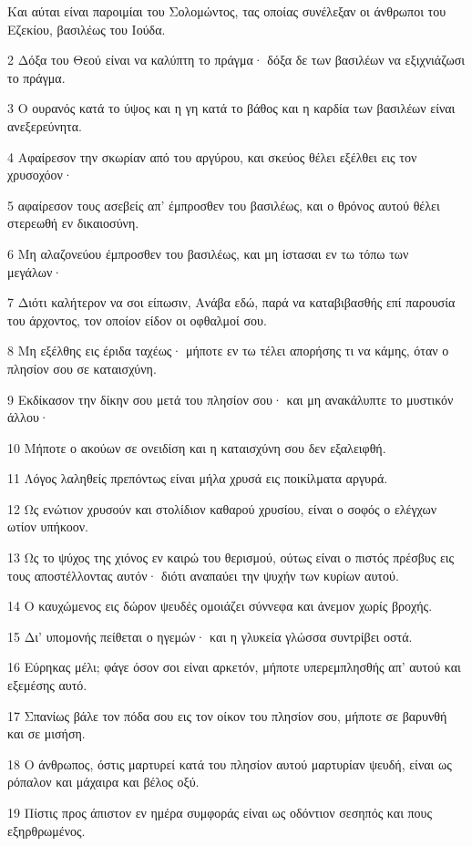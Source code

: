 \par Και αύται είναι παροιμίαι του Σολομώντος, τας οποίας συνέλεξαν οι άνθρωποι του Εζεκίου, βασιλέως του Ιούδα.
\par 2 Δόξα του Θεού είναι να καλύπτη το πράγμα· δόξα δε των βασιλέων να εξιχνιάζωσι το πράγμα.
\par 3 Ο ουρανός κατά το ύψος και η γη κατά το βάθος και η καρδία των βασιλέων είναι ανεξερεύνητα.
\par 4 Αφαίρεσον την σκωρίαν από του αργύρου, και σκεύος θέλει εξέλθει εις τον χρυσοχόον·
\par 5 αφαίρεσον τους ασεβείς απ' έμπροσθεν του βασιλέως, και ο θρόνος αυτού θέλει στερεωθή εν δικαιοσύνη.
\par 6 Μη αλαζονεύου έμπροσθεν του βασιλέως, και μη ίστασαι εν τω τόπω των μεγάλων·
\par 7 Διότι καλήτερον να σοι είπωσιν, Ανάβα εδώ, παρά να καταβιβασθής επί παρουσία του άρχοντος, τον οποίον είδον οι οφθαλμοί σου.
\par 8 Μη εξέλθης εις έριδα ταχέως· μήποτε εν τω τέλει απορήσης τι να κάμης, όταν ο πλησίον σου σε καταισχύνη.
\par 9 Εκδίκασον την δίκην σου μετά του πλησίον σου· και μη ανακάλυπτε το μυστικόν άλλου·
\par 10 Μήποτε ο ακούων σε ονειδίση και η καταισχύνη σου δεν εξαλειφθή.
\par 11 Λόγος λαληθείς πρεπόντως είναι μήλα χρυσά εις ποικίλματα αργυρά.
\par 12 Ως ενώτιον χρυσούν και στολίδιον καθαρού χρυσίου, είναι ο σοφός ο ελέγχων ωτίον υπήκοον.
\par 13 Ως το ψύχος της χιόνος εν καιρώ του θερισμού, ούτως είναι ο πιστός πρέσβυς εις τους αποστέλλοντας αυτόν· διότι αναπαύει την ψυχήν των κυρίων αυτού.
\par 14 Ο καυχώμενος εις δώρον ψευδές ομοιάζει σύννεφα και άνεμον χωρίς βροχής.
\par 15 Δι' υπομονής πείθεται ο ηγεμών· και η γλυκεία γλώσσα συντρίβει οστά.
\par 16 Εύρηκας μέλι; φάγε όσον σοι είναι αρκετόν, μήποτε υπερεμπλησθής απ' αυτού και εξεμέσης αυτό.
\par 17 Σπανίως βάλε τον πόδα σου εις τον οίκον του πλησίον σου, μήποτε σε βαρυνθή και σε μισήση.
\par 18 Ο άνθρωπος, όστις μαρτυρεί κατά του πλησίον αυτού μαρτυρίαν ψευδή, είναι ως ρόπαλον και μάχαιρα και βέλος οξύ.
\par 19 Πίστις προς άπιστον εν ημέρα συμφοράς είναι ως οδόντιον σεσηπός και πους εξηρθρωμένος.
